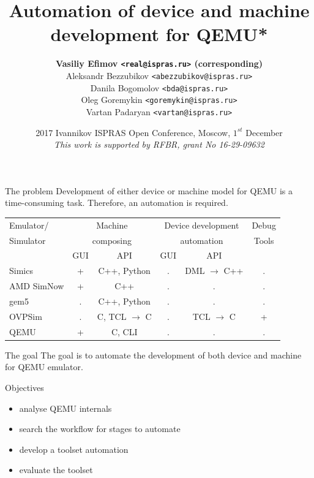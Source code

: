 \documentclass[unicode,hyperref={unicode=true},aspectratio=169]{beamer}
\title[]
{Automation of device and machine development for QEMU*}
\author[]{\textbf{%
Vasiliy Efimov \texttt{<real@ispras.ru>} (corresponding)}\\%
Aleksandr Bezzubikov \texttt{<abezzubikov@ispras.ru>}\\%
Danila Bogomolov \texttt{<bda@ispras.ru>}\\%
Oleg Goremykin \texttt{<goremykin@ispras.ru>}\\%
Vartan Padaryan \texttt{<vartan@ispras.ru>}%
}
\institute[]{Ivannikov Institute for System Programming of the RAS}
\date[]{2017 Ivannikov ISPRAS Open Conference, Moscow, \(1^{st}\) December\\%
\vfill
\textit{\tiny *This work is supported by RFBR, grant No 16-29-09632}}
\begin{document}
\begin{frame}
\titlepage
\end{frame}



\begin{frame}[fragile]{The problem}
Development of either device or machine model for QEMU is a
time-consuming task. Therefore, an automation is required.
\vfill
\begin{center}
\begin{tabular}{l|c|c|c|c|c}
Emulator/  & \multicolumn{2}{c|}{Machine}   & \multicolumn{2}{c|}{Device development} & Debug \\
Simulator  & \multicolumn{2}{c|}{composing} & \multicolumn{2}{c|}{automation}         & Tools \\
           & GUI & API                      & GUI & API                               &       \\
\hline
Simics     &  +  & C++, Python              & .   & DML \(\rightarrow\) C++           & .     \\
AMD SimNow &  +  & C++                      & .   & .                                 & .     \\
gem5       &  .  & C++, Python              & .   & .                                 & .     \\
OVPSim     &  .  & C, TCL \(\rightarrow\) C & .   & TCL \(\rightarrow\) C             & +     \\
QEMU       &  +  & C, CLI                   & .   & .                                 & .     \\
\end{tabular}
\end{center}
\end{frame}



\begin{frame}{The goal}
The goal is to automate the development of both device and machine for QEMU
emulator.

\vfill

{Objectives}
\begin{itemize}
\item analyse QEMU internals
\item search the workflow for stages to automate
\item develop a toolset automation
\item evaluate the toolset
\end{itemize}
\end{frame}
\end{document}
